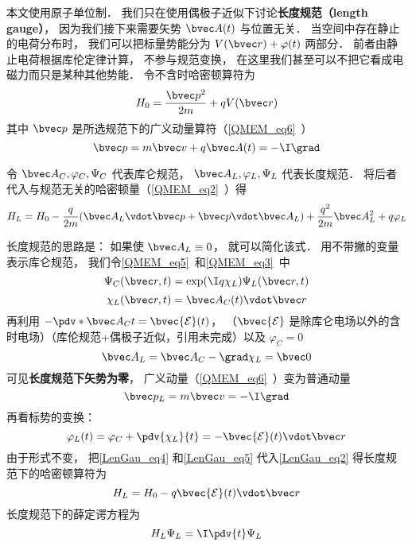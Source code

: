 

本文使用原子单位制． 我们只在使用偶极子近似下讨论\textbf{长度规范（length gauge）}， 因为我们接下来需要矢势 $\bvec A(t)$ 与位置无关． 当空间中存在静止的电荷分布时， 我们可以把标量势能分为 $V(\bvec r) + \varphi(t)$ 两部分． 前者由静止电荷根据库伦定律计算， 不参与规范变换， 在这里我们甚至可以不把它看成电磁力而只是某种其他势能． 令不含时哈密顿算符为
\begin{equation}
H_0 = \frac{\bvec p^2}{2m} + qV(\bvec r)
\end{equation}
其中 $\bvec p$ 是所选规范下的广义动量算符（\autoref{QMEM_eq6}~）
\begin{equation}
\bvec p = m \bvec v + q\bvec A(t) = -\I \grad
\end{equation}

令 $\bvec A_C, \varphi_C, \Psi_C$ 代表库仑规范， $\bvec A_L, \varphi_L, \Psi_L$ 代表长度规范． 将后者代入与规范无关的哈密顿量（\autoref{QMEM_eq2}~）得
\begin{equation}\label{LenGau_eq2}
H_L = H_0 - \frac{q}{2m} (\bvec A_L \vdot \bvec p + \bvec p \vdot \bvec A_L)
+ \frac{q^2}{2m} \bvec A_L^2 + q \varphi_L
\end{equation}


长度规范的思路是： 如果使 $\bvec A_L \equiv 0$， 就可以简化该式． 用不带撇的变量表示库仑规范， 我们令\autoref{QMEM_eq5}~和\autoref{QMEM_eq3}~中
\begin{equation}\label{LenGau_eq1}
\Psi_C(\bvec r, t) = \exp(\I q\chi_L)\Psi_L(\bvec r, t)
\end{equation}
\begin{equation}
\chi_L(\bvec r, t) = \bvec A_C(t) \vdot \bvec r
\end{equation}
再利用 $-\pdv*{\bvec A_C}{t} = \bvec {\mathcal E}(t)$， （$\bvec {\mathcal E}$ 是除库仑电场以外的含时电场）（库伦规范+偶极子近似，引用未完成）以及 $\varphi_C = 0$
\begin{equation}\label{LenGau_eq4}
\bvec A_L = \bvec A_C - \grad \chi_L = \bvec 0
\end{equation}
可见\textbf{长度规范下矢势为零}， 广义动量（\autoref{QMEM_eq6}~）变为普通动量
\begin{equation}\label{LenGau_eq6}
\bvec p_L = m \bvec v = -\I \grad
\end{equation}
再看标势的变换：
\begin{equation}\label{LenGau_eq5}
\varphi_L(t) = \varphi_C + \pdv{\chi_L}{t} = -\bvec {\mathcal E}(t) \vdot \bvec r
\end{equation}
由于形式不变， 把\autoref{LenGau_eq4} 和\autoref{LenGau_eq5} 代入\autoref{LenGau_eq2} 得长度规范下的哈密顿算符为
\begin{equation}\label{LenGau_eq7}
H_L = H_0 - q\bvec{\mathcal{E}}(t) \vdot \bvec r
\end{equation}
长度规范下的薛定谔方程为
\begin{equation}\label{LenGau_eq3}
H_L \Psi_L = \I \pdv{t} \Psi_L
\end{equation}
